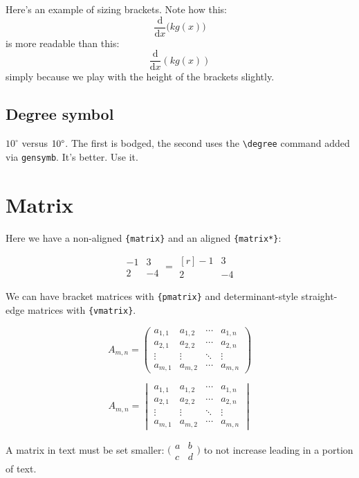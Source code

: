 \documentclass[../main]{subfiles}
\begin{document}
Here's an example of sizing brackets. Note how this:
\begin{equation*}
    \frac{\mathrm d}{\mathrm d x} \big( k g(x) \big)
\end{equation*}
is more readable than this:
\begin{equation*}
    \frac{\mathrm d}{\mathrm d x} \left( k g(x) \right)
\end{equation*} simply because we play with the height of the brackets slightly.

\subsection{Degree symbol}

$10^\circ{}$ versus $10\degree$. The first is bodged, the second uses the \verb|\degree| command added via \verb|gensymb|. It's better. Use it.

\section{Matrix}
Here we have a non-aligned \verb|{matrix}| and an aligned \verb|{matrix*}|:

\begin{equation*}
\begin{matrix}
  -1 & 3 \\
  2 & -4
\end{matrix}
 =
\begin{matrix*}[r]
  -1 & 3 \\
  2 & -4
\end{matrix*}
\end{equation*}

We can have bracket matrices with \verb|{pmatrix}| and determinant-style straight-edge matrices with \verb|{vmatrix}|.

\begin{equation*}
A_{m,n} = 
 \begin{pmatrix*}
  a_{1,1} & a_{1,2} & \cdots & a_{1,n} \\
  a_{2,1} & a_{2,2} & \cdots & a_{2,n} \\
  \vdots  & \vdots  & \ddots & \vdots  \\
  a_{m,1} & a_{m,2} & \cdots & a_{m,n} 
 \end{pmatrix*}
\end{equation*}

\begin{equation*}
A_{m,n} = 
 \begin{vmatrix*}
  a_{1,1} & a_{1,2} & \cdots & a_{1,n} \\
  a_{2,1} & a_{2,2} & \cdots & a_{2,n} \\
  \vdots  & \vdots  & \ddots & \vdots  \\
  a_{m,1} & a_{m,2} & \cdots & a_{m,n} 
 \end{vmatrix*}
\end{equation*}


A matrix in text must be set smaller:
$\bigl(\begin{smallmatrix}
a&b \\ c&d
\end{smallmatrix} \bigr)$
to not increase leading in a portion of text.
\end{document}
